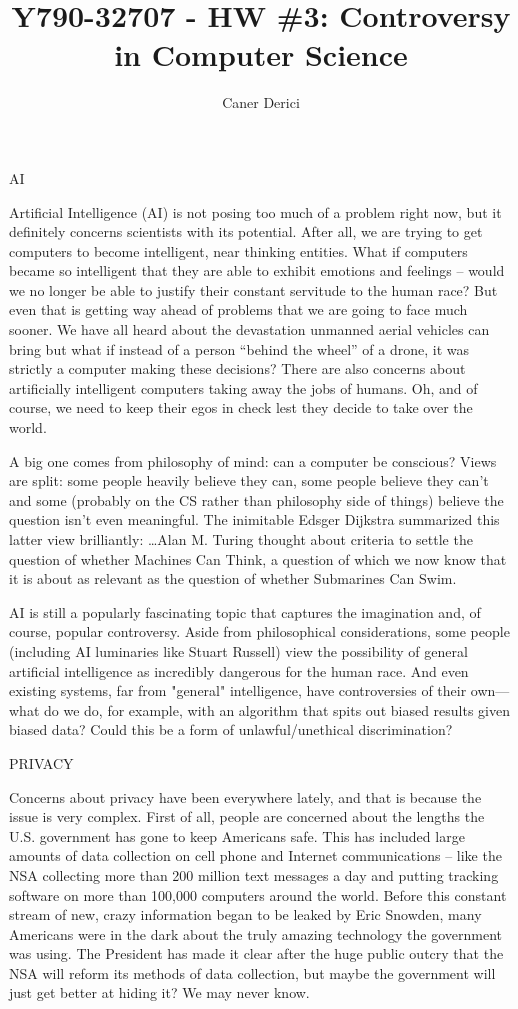 \documentclass{article}
\title{Y790-32707 - HW \#3: Controversy in Computer Science}
\author{}
\date{Caner Derici}
\begin{document}

\maketitle


AI

Artificial Intelligence (AI) is not posing too much of a problem right
now, but it definitely concerns scientists with its potential.  After
all, we are trying to get computers to become intelligent, near
thinking entities.  What if computers became so intelligent that they
are able to exhibit emotions and feelings – would we no longer be able
to justify their constant servitude to the human race?  But even that
is getting way ahead of problems that we are going to face much
sooner.  We have all heard about the devastation unmanned aerial
vehicles can bring but what if instead of a person “behind the wheel”
of a drone, it was strictly a computer making these decisions?  There
are also concerns about artificially intelligent computers taking away
the jobs of humans.  Oh, and of course, we need to keep their egos in
check lest they decide to take over the world.

A big one comes from philosophy of mind: can a computer be conscious?
Views are split: some people heavily believe they can, some people
believe they can't and some (probably on the CS rather than philosophy
side of things) believe the question isn't even meaningful. The
inimitable Edsger Dijkstra summarized this latter view brilliantly:
…Alan M. Turing thought about criteria to settle the question of
whether Machines Can Think, a question of which we now know that it is
about as relevant as the question of whether Submarines Can Swim.

AI is still a popularly fascinating topic that captures the
imagination and, of course, popular controversy. Aside from
philosophical considerations, some people (including AI luminaries
like Stuart Russell) view the possibility of general artificial
intelligence as incredibly dangerous for the human race. And even
existing systems, far from "general" intelligence, have controversies
of their own—what do we do, for example, with an algorithm that spits
out biased results given biased data? Could this be a form of
unlawful/unethical discrimination?

PRIVACY

Concerns about privacy have been everywhere lately, and that is
because the issue is very complex.  First of all, people are concerned
about the lengths the U.S. government has gone to keep Americans safe.
This has included large amounts of data collection on cell phone and
Internet communications – like the NSA collecting more than 200
million text messages a day and putting tracking software on more than
100,000 computers around the world.  Before this constant stream of
new, crazy information began to be leaked by Eric Snowden, many
Americans were in the dark about the truly amazing technology the
government was using.  The President has made it clear after the huge
public outcry that the NSA will reform its methods of data collection,
but maybe the government will just get better at hiding it?  We may
never know.
\end{document}
